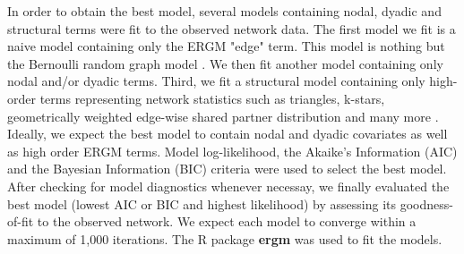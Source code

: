 In order to obtain the best model, several models containing nodal, dyadic and structural terms were fit to the observed network data. The first model we fit is a naive model containing only the ERGM "edge" term. This model is nothing but the Bernoulli random graph model \cite{erdos_random_1959}. We then fit another model containing only nodal and/or dyadic terms. Third, we fit a structural model containing only high-order terms representing network statistics such as triangles, k-stars, geometrically weighted edge-wise shared partner distribution and many more \cite{kolaczyk_statistical_2014,robins_introduction_2007}. Ideally, we expect the best model to contain nodal and dyadic covariates as well as high order ERGM terms. Model log-likelihood, the Akaike's Information (AIC) and the Bayesian Information (BIC) criteria were used to select the best model. After checking for model diagnostics whenever necessay, we finally evaluated the best model (lowest AIC or BIC and highest likelihood) by assessing its goodness-of-fit to the observed network. We expect each model to converge within a maximum of 1,000 iterations. The R package \textbf{ergm} was used to fit the models.


